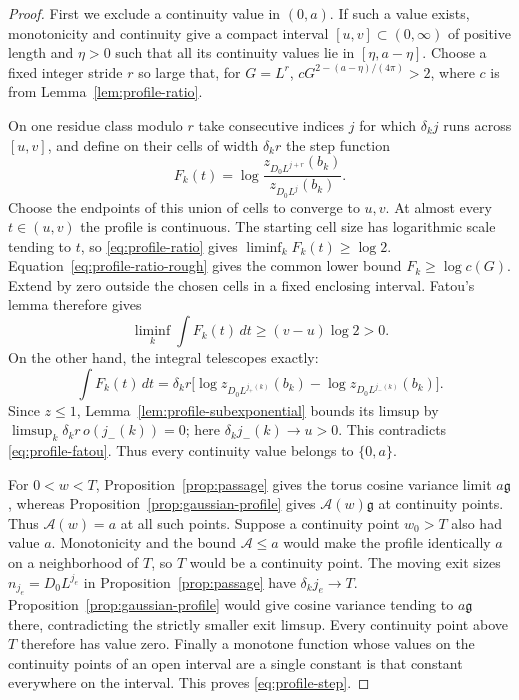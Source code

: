 \begin{proof}
First we exclude a continuity value in $(0,a)$. If such a value
exists, monotonicity and continuity give a compact interval
$[u,v]\subset(0,\infty)$ of positive length and $\eta>0$ such that
all its continuity values lie in $[\eta,a-\eta]$. Choose a fixed
integer stride $r$ so large that, for $G=L^r$,
$cG^{2-(a-\eta)/(4\pi)}>2$, where $c$ is from
Lemma~\ref{lem:profile-ratio}.

On one residue class modulo $r$ take consecutive indices $j$ for
which $\delta_k j$ runs across $[u,v]$, and define on their cells
of width $\delta_kr$ the step function
\[
 F_k(t)=\log\frac{z_{D_0L^{j+r}}(b_k)}{z_{D_0L^j}(b_k)}.
\]
Choose the endpoints of this union of cells to converge to $u,v$.
At almost every $t\in(u,v)$ the profile is continuous. The starting
cell size has logarithmic scale tending to $t$, so
\eqref{eq:profile-ratio} gives $\liminf_k F_k(t)\ge\log2$.
Equation~\eqref{eq:profile-ratio-rough} gives the common lower bound
$F_k\ge\log c(G)$. Extend by zero outside the chosen cells in a
fixed enclosing interval. Fatou's lemma therefore gives
\begin{equation}\label{eq:profile-fatou}
          \liminf_k\int F_k(t)\,dt\ge(v-u)\log2>0.
\end{equation}
On the other hand, the integral telescopes exactly:
\[
 \int F_k(t)\,dt
 =\delta_kr\bigl[\log z_{D_0L^{j_+(k)}}(b_k)
                    -\log z_{D_0L^{j_-(k)}}(b_k)\bigr].
\]
Since $z\le1$, Lemma~\ref{lem:profile-subexponential} bounds its
limsup by
$\limsup_k\delta_kr\,o(j_-(k))=0$; here
$\delta_kj_-(k)\to u>0$. This contradicts
\eqref{eq:profile-fatou}. Thus every continuity value belongs to
$\{0,a\}$.

For $0<w<T$, Proposition~\ref{prop:passage} gives the torus cosine
variance limit $a\mathfrak g$, whereas
Proposition~\ref{prop:gaussian-profile} gives
$\mathcal A(w)\mathfrak g$ at continuity points. Thus
$\mathcal A(w)=a$ at all such points. Suppose a continuity point
$w_0>T$ also had value $a$. Monotonicity and the bound
$\mathcal A\le a$ would make the profile identically $a$ on a
neighborhood of $T$, so $T$ would be a continuity point. The moving
exit sizes $n_{j_e}=D_0L^{j_e}$ in Proposition~\ref{prop:passage}
have $\delta_kj_e\to T$. Proposition~\ref{prop:gaussian-profile}
would give cosine variance tending to $a\mathfrak g$ there,
contradicting the strictly smaller exit limsup. Every continuity
point above $T$ therefore has value zero. Finally a monotone function
whose values on the continuity points of an open interval are a
single constant is that constant everywhere on the interval.
This proves \eqref{eq:profile-step}.
\end{proof}
